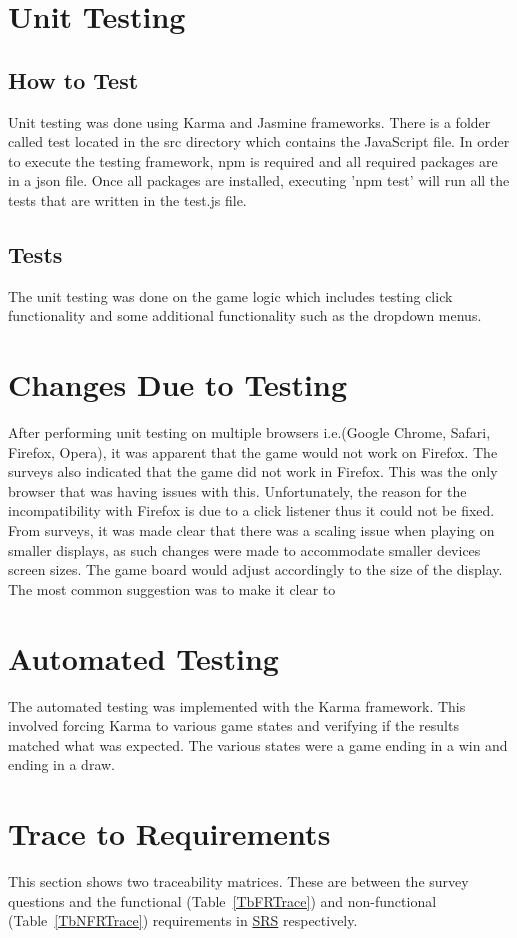 \documentclass[12pt, titlepage]{article}
\begin{document}
\section{Unit Testing}
\subsection{How to Test}
Unit testing was done using Karma and Jasmine frameworks. There is a folder called test
located in the src directory which contains the JavaScript file. In order to execute the testing framework, 
npm is required and all required packages are in a json file. Once all packages are installed, 
executing 'npm test' will run all the tests that are written in the test.js file.
\subsection{Tests}
The unit testing was done on the game logic which includes testing click functionality and some additional functionality such as the dropdown menus.
\section{Changes Due to Testing} \label{ChangesAfterTesting}
After performing unit testing on multiple browsers i.e.(Google Chrome, Safari, Firefox, Opera),
it was apparent that the game would not work on Firefox. The surveys also indicated that the game did
not work in Firefox. This was the only browser that was having issues with this. Unfortunately,
the reason for the incompatibility with Firefox is due to a click listener thus it could not be fixed. From
surveys, it was made clear that there was a scaling issue when playing on smaller displays, as such
changes were made to accommodate smaller devices screen sizes. The game board would adjust 
accordingly to the size of the display. The most common suggestion was to make it clear to 
\section{Automated Testing}
The automated testing was implemented with the Karma framework. This involved forcing Karma
to various game states and verifying if the results matched what was expected. The various 
states were a game ending in a win and ending in a draw.

\section{Trace to Requirements}
This section shows two traceability matrices. These are between the survey questions and the functional (Table~\ref{TbFRTrace}) and non-functional (Table~\ref{TbNFRTrace}) requirements in \href{run:../SRS/SRS.pdf}{SRS} respectively.
\end{document}
